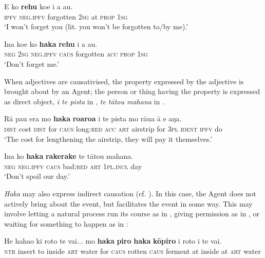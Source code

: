 \ea\label{ex:8.226}
\gll E ko \textbf{rehu} koe i a au. \\
\textsc{ipfv} \textsc{neg.ipfv} forgotten \textsc{2sg} at \textsc{prop} \textsc{1sg} \\

\glt 
‘I won’t forget you (lit. you won’t be forgotten to/by me).’ \textstyleExampleref{[R216.020]} 
\z

\ea\label{ex:8.227}
\gll {\ꞌ}Ina koe ko \textbf{haka} \textbf{rehu} i a au. \\
\textsc{neg} \textsc{2sg} \textsc{neg.ipfv} \textsc{caus} forgotten \textsc{acc} \textsc{prop} \textsc{1sg} \\

\glt 
‘Don’t forget me.’ \textstyleExampleref{[R224.016]} 
\z

When adjectives are causativised, the property expressed by the adjective is brought about by an Agent; the person or thing having the property is expressed as direct object, \textit{i te pista} in , \textit{te tātou mahana} in .

\ea\label{ex:8.228}
\gll Rā pau era mo \textbf{haka} \textbf{roaroa} i te pista mo rāua {\ꞌ}ā e aŋa. \\
\textsc{dist} cost \textsc{dist} for \textsc{caus} long:\textsc{red} \textsc{acc} \textsc{art} airstrip for \textsc{3pl} \textsc{ident} \textsc{ipfv} do \\

\glt 
‘The cost for lengthening the airstrip, they will pay it themselves.’ \textstyleExampleref{[R201.035]} 
\z

\ea\label{ex:8.229}
\gll {\ꞌ}Ina ko \textbf{haka} \textbf{rakerake} te tātou mahana. \\
\textsc{neg} \textsc{neg.ipfv} \textsc{caus} bad:\textsc{red} \textsc{art} \textsc{1pl.incl} day \\

\glt 
‘Don’t spoil our day.’ \textstyleExampleref{[R649.184]} 
\z

\textit{Haka} may also express indirect causation (cf. \citealt[274]{Dixon2012}). In this case, the Agent does not actively bring about the event, but facilitates the event in some way. This may involve letting a natural process run its course as in , giving permission as in , or waiting for something to happen as in :

\ea\label{ex:8.230}
\gll He haha{\ꞌ}o ki roto te vai... mo \textbf{haka} \textbf{piro} \textbf{haka} \textbf{kōpiro} {\ꞌ}i roto i te vai. \\
\textsc{ntr} insert to inside \textsc{art} water for \textsc{caus} rotten \textsc{caus} ferment at inside at \textsc{art} water \\

